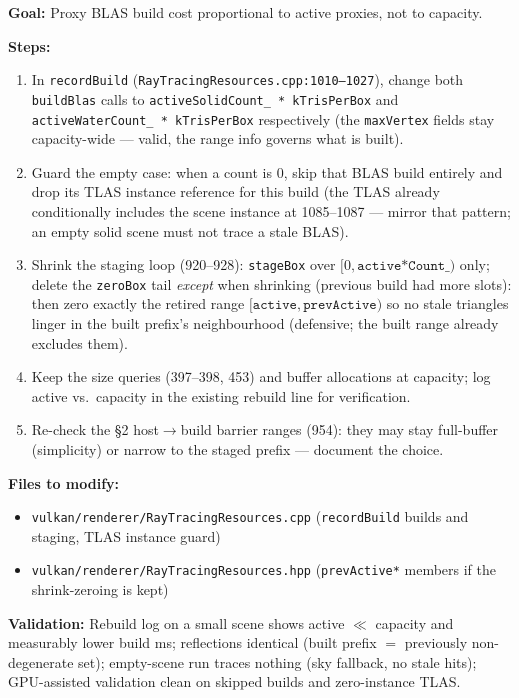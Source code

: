 \documentclass[11pt,a4paper]{article}
\begin{document}
\begin{tcolorbox}[promptbox={Prompt: Build Only the Active Proxy Prefix}]
\textbf{Goal:} Proxy BLAS build cost proportional to active proxies, not to capacity.

\textbf{Steps:}
\begin{enumerate}
    \item In \texttt{recordBuild} (\texttt{RayTracingResources.cpp:1010--1027}), change both \texttt{buildBlas} calls to \texttt{activeSolidCount\_ * kTrisPerBox} and \texttt{activeWaterCount\_ * kTrisPerBox} respectively (the \texttt{maxVertex} fields stay capacity-wide --- valid, the range info governs what is built).
    \item Guard the empty case: when a count is 0, skip that BLAS build entirely and drop its TLAS instance reference for this build (the TLAS already conditionally includes the scene instance at 1085--1087 --- mirror that pattern; an empty solid scene must not trace a stale BLAS).
    \item Shrink the staging loop (920--928): \texttt{stageBox} over $[0, \texttt{active*Count\_})$ only; delete the \texttt{zeroBox} tail \emph{except} when shrinking (previous build had more slots): then zero exactly the retired range $[\texttt{active}, \texttt{prevActive})$ so no stale triangles linger in the built prefix's neighbourhood (defensive; the built range already excludes them).
    \item Keep the size queries (397--398, 453) and buffer allocations at capacity; log active vs.\ capacity in the existing rebuild line for verification.
    \item Re-check the \S2 host$\to$build barrier ranges (954): they may stay full-buffer (simplicity) or narrow to the staged prefix --- document the choice.
\end{enumerate}

\textbf{Files to modify:}
\begin{itemize}
    \item \texttt{vulkan/renderer/RayTracingResources.cpp} (\texttt{recordBuild} builds and staging, TLAS instance guard)
    \item \texttt{vulkan/renderer/RayTracingResources.hpp} (\texttt{prevActive*} members if the shrink-zeroing is kept)
\end{itemize}

\textbf{Validation:} Rebuild log on a small scene shows active $\ll$ capacity and measurably lower build ms; reflections identical (built prefix $=$ previously non-degenerate set); empty-scene run traces nothing (sky fallback, no stale hits); GPU-assisted validation clean on skipped builds and zero-instance TLAS.
\end{tcolorbox}
\end{document}
